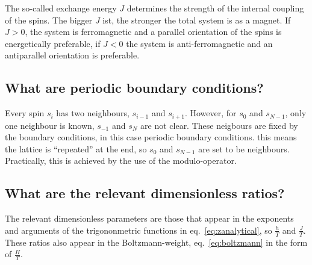 \documentclass{scrartcl}
\begin{document}
The so-called exchange energy $J$ determines the strength of the internal coupling of the spins. The bigger $J$ ist, the stronger the total system is as a magnet. If $J>0$, the system is ferromagnetic and a parallel orientation of the spins is energetically preferable, if $J<0$ the system is anti-ferromagnetic and an antiparallel orientation is preferable.

\subsection{What are periodic boundary conditions?}
Every spin $s_i$ has two neighbours, $s_{i-1}$ and $s_{i+1}$. However, for $s_0$ and $s_{N-1}$, only one neighbour is known, $s_{-1}$ and $s_N$ are not clear. These neigbours are fixed by the boundary conditions, in this case periodic boundary conditions. this means the lattice is \enquote{repeated} at the end, so $s_0$ and $s_{N-1}$ are set to be neighbours. Practically, this is achieved by the use of the modulo-operator.

\subsection{What are the relevant dimensionless ratios?}

The relevant dimensionless parameters are those that appear in the exponents and arguments of the trigononmetric functions in eq.~\ref{eq:zanalytical}, so $\frac{h}{T}$ and $\frac{J}{T}$. These ratios also appear in the Boltzmann-weight, eq.~\ref{eq:boltzmann} in the form of $\frac{H}{T}$.
\end{document}
